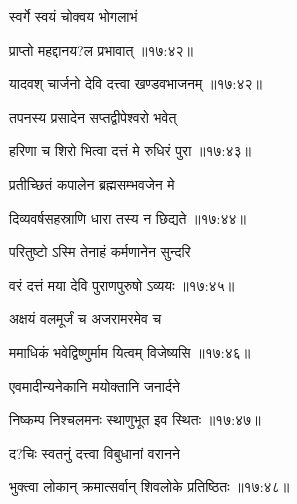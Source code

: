 \nemslokac

{\devanagarifontbold स्वर्गे स्वयं चोक्वय भोगलाभं }%
  \dontdisplaylinenum

\nemslokad

{\devanagarifontbold प्राप्तो महद्दानय?ल प्रभावात् {॥१७:४२॥} \veg\dontdisplaylinenum }%
 
\vers



{\devanagarifontbold यादवश् चार्जनो देवि दत्त्वा खण्डवभाजनम् {॥१७:४२॥} \veg\dontdisplaylinenum }%
 
{\devanagarifontbold तपनस्य प्रसादेन सप्तद्वीपेश्वरो भवेत् \thinspace{\dandab} \dontdisplaylinenum }%
 

{\devanagarifontbold हरिणा च शिरो भित्वा दत्तं मे रुधिरं पुरा {॥१७:४३॥} \veg\dontdisplaylinenum }%
 
{\devanagarifontbold प्रतीच्छितं कपालेन ब्रह्मसम्भवजेन मे \thinspace{\dandab} \dontdisplaylinenum }%
 

{\devanagarifontbold दिव्यवर्षसहस्राणि धारा तस्य न छिद्यते {॥१७:४४॥} \veg\dontdisplaylinenum }%
 
{\devanagarifontbold परितुष्टो ऽस्मि तेनाहं कर्मणानेन सुन्दरि \thinspace{\dandab} \dontdisplaylinenum }%
 

{\devanagarifontbold वरं दत्तं मया देवि पुराणपुरुषो ऽव्ययः {॥१७:४५॥} \veg\dontdisplaylinenum }%
 
{\devanagarifontbold अक्षयं वलमूर्जं च अजरामरमेव च \thinspace{\dandab} \dontdisplaylinenum }%
 

{\devanagarifontbold ममाधिकं भवेद्विष्णुर्माम यित्वम् विजेष्यसि {॥१७:४६॥} \veg\dontdisplaylinenum }%
 
{\devanagarifontbold एवमादीन्यनेकानि मयोक्तानि जनार्दने \thinspace{\dandab} \dontdisplaylinenum }%
 

{\devanagarifontbold निष्कम्प निश्चलमनः स्थाणुभूत इव स्थितः {॥१७:४७॥} \veg\dontdisplaylinenum }%
 
{\devanagarifontbold द?चिः स्वतनुं दत्त्वा विबुधानां वरानने \thinspace{\dandab} \dontdisplaylinenum }%
 

{\devanagarifontbold भुक्त्वा लोकान् क्रमात्सर्वान् शिवलोके प्रतिष्ठितः {॥१७:४८॥} \veg\dontdisplaylinenum }%
 
